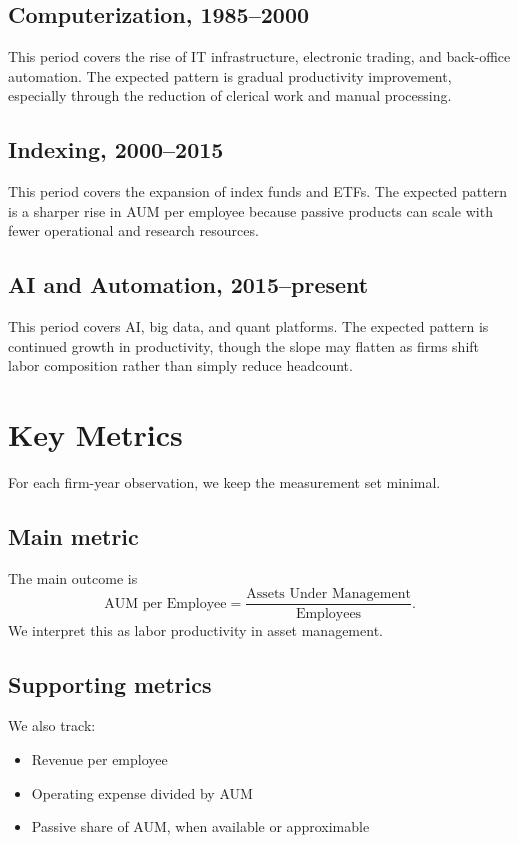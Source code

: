 \documentclass{article}
\begin{document}
\subsection{Computerization, 1985--2000}
This period covers the rise of IT infrastructure, electronic trading, and back-office automation. The expected pattern is gradual productivity improvement, especially through the reduction of clerical work and manual processing.

\subsection{Indexing, 2000--2015}
This period covers the expansion of index funds and ETFs. The expected pattern is a sharper rise in AUM per employee because passive products can scale with fewer operational and research resources.

\subsection{AI and Automation, 2015--present}
This period covers AI, big data, and quant platforms. The expected pattern is continued growth in productivity, though the slope may flatten as firms shift labor composition rather than simply reduce headcount.

\section{Key Metrics}
For each firm-year observation, we keep the measurement set minimal.

\subsection{Main metric}
The main outcome is
\[
\text{AUM per Employee} = \frac{\text{Assets Under Management}}{\text{Employees}}.
\]
We interpret this as labor productivity in asset management.

\subsection{Supporting metrics}
We also track:
\begin{itemize}
  \item Revenue per employee
  \item Operating expense divided by AUM
  \item Passive share of AUM, when available or approximable
\end{itemize}
\end{document}
